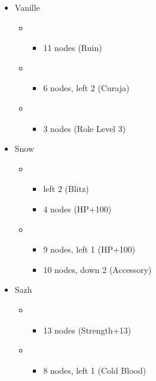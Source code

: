 \begin{menu}
	\begin{itemize}
		\crystarium
		\begin{itemize}
			\item Vanille
				\begin{itemize}
					\item \com
						\begin{itemize}
							\item 11 nodes (Ruin)
						\end{itemize}
					\item \med
						\begin{itemize}
							\item 6 nodes, left 2 (Curaja)
						\end{itemize}
					\item \rav
						\begin{itemize}
							\item 3 nodes (Role Level 3)
						\end{itemize}	
				\end{itemize}
			\item Snow
				\begin{itemize}
					\item \com
						\begin{itemize}
							\item left 2 (Blitz)
							\item 4 nodes (HP+100)
						\end{itemize}
					\item \rav
						\begin{itemize}
							\item 9 nodes, left 1 (HP+100)
							\item 10 nodes, down 2 (Accessory)
						\end{itemize}
				\end{itemize}
			\item Sazh
				\begin{itemize}
					\item \com
						\begin{itemize}
							\item 13 nodes (Strength+13)
						\end{itemize}
					\item \rav
						\begin{itemize}
							\item 8 nodes, left 1 (Cold Blood)
						\end{itemize}
				\end{itemize}								

\end{itemize}
\end{itemize}
\end{menu}
